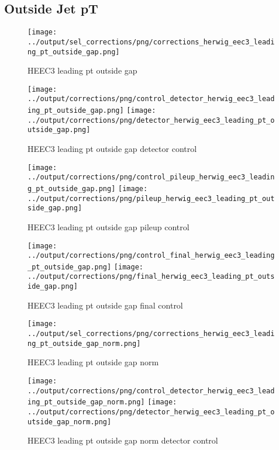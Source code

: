\documentclass[11pt]{book}
\begin{document}
\clearpage
\subsection{Outside Jet pT}

\begin{figure}[ht]
\centering
\texttt{[image: ../output/sel\_corrections/png/corrections\_herwig\_eec3\_leading\_pt\_outside\_gap.png]}
\caption{HEEC3 leading pt outside gap}
\label{fig:HEEC3_leading_pt_outside_gap}
\end{figure}


\begin{figure}[ht]
\centering
\texttt{[image: ../output/corrections/png/control\_detector\_herwig\_eec3\_leading\_pt\_outside\_gap.png]}
\texttt{[image: ../output/corrections/png/detector\_herwig\_eec3\_leading\_pt\_outside\_gap.png]}
\caption{HEEC3 leading pt outside gap detector control}
\label{fig:HEEC3_leading_pt_outside_gap_detector_control}
\end{figure}

\begin{figure}[ht]
\centering
\texttt{[image: ../output/corrections/png/control\_pileup\_herwig\_eec3\_leading\_pt\_outside\_gap.png]}
\texttt{[image: ../output/corrections/png/pileup\_herwig\_eec3\_leading\_pt\_outside\_gap.png]}
\caption{HEEC3 leading pt outside gap pileup control}
\label{fig:HEEC3_leading_pt_outside_gap_pileup_control}
\end{figure}


\begin{figure}[ht]
\centering
\texttt{[image: ../output/corrections/png/control\_final\_herwig\_eec3\_leading\_pt\_outside\_gap.png]}
\texttt{[image: ../output/corrections/png/final\_herwig\_eec3\_leading\_pt\_outside\_gap.png]}
\caption{HEEC3 leading pt outside gap final control}
\label{fig:HEEC3_leading_pt_outside_gap_final_control}
\end{figure}

\begin{figure}[ht]
\centering
\texttt{[image: ../output/sel\_corrections/png/corrections\_herwig\_eec3\_leading\_pt\_outside\_gap\_norm.png]}
\caption{HEEC3 leading pt outside gap norm}
\label{fig:HEEC3_leading_pt_outside_gap_norm}
\end{figure}


\begin{figure}[ht]
\centering
\texttt{[image: ../output/corrections/png/control\_detector\_herwig\_eec3\_leading\_pt\_outside\_gap\_norm.png]}
\texttt{[image: ../output/corrections/png/detector\_herwig\_eec3\_leading\_pt\_outside\_gap\_norm.png]}
\caption{HEEC3 leading pt outside gap norm detector control}
\label{fig:HEEC3_leading_pt_outside_gap_norm_detector_control}
\end{figure}
\end{document}
